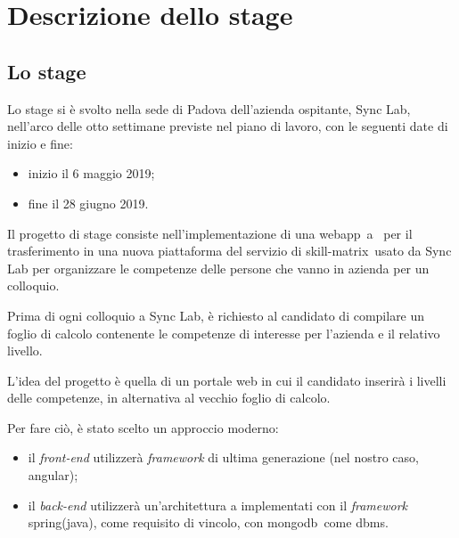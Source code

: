 
\chapter{Descrizione dello stage}\label{cap:descrizione-stage}



\section{Lo stage}

Lo stage si è svolto nella sede di Padova dell'azienda ospitante, Sync Lab, nell'arco delle otto settimane previste nel piano di lavoro, con le seguenti date di inizio e fine:
\begin{itemize}
	\item inizio il 6 maggio 2019;
	\item fine il 28 giugno 2019.
\end{itemize}
Il progetto di stage consiste nell'implementazione di una \gls{webapp}\gloss\ a \gloss\ per il trasferimento in una nuova piattaforma del servizio di \gls{skill-matrix}\gloss\ usato da Sync Lab per organizzare le competenze delle persone che vanno in azienda per un colloquio.

Prima di ogni colloquio a Sync Lab, è richiesto al candidato di compilare un foglio di calcolo contenente le competenze di interesse
per l'azienda e il relativo livello.

L'idea del progetto è quella di un portale web in cui il candidato inserirà i livelli delle competenze, in alternativa al vecchio foglio di calcolo.

Per fare ciò, è stato scelto un approccio moderno: 
\begin{itemize}
	\item il \textit{front-end} utilizzerà \textit{framework} di ultima generazione (nel nostro caso, \gls{angular}\gloss);
	\item il \textit{back-end} utilizzerà un'architettura a  implementati con il \textit{framework} \gls{spring}\gloss (\gls{java}\gloss), come requisito di vincolo, con \gls{mongodb}\gloss\ come \gls{dbms}\gloss.
\end{itemize}

